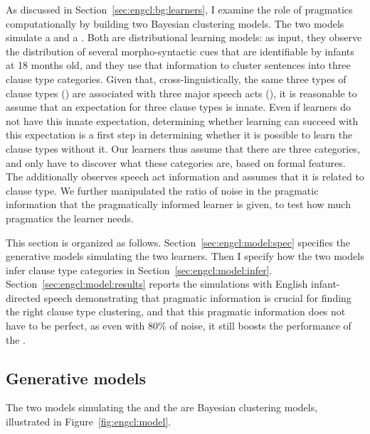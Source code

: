 As discussed in Section~\ref{sec:engcl:bg:learners}, I examine the role of pragmatics computationally by building two Bayesian clustering models. The two models simulate a \distlearner{} and a \praglearner{}. Both are distributional learning models: as input, they observe the distribution of several morpho-syntactic cues that are identifiable by infants at 18 months old, and they use that information to cluster sentences into three clause type categories. Given that, cross-linguistically, the same three types of clause types (\diis{}) are associated with three major speech acts (\aqrs{}), it is reasonable to assume that an expectation for three clause types is innate. Even if learners do not have this innate expectation, determining whether learning can succeed with this expectation is a first step in determining whether it is possible to learn the clause types without it. Our learners thus assume that there are three categories, and only have to discover what these categories are, based on formal features. The \praglearner{} additionally observes speech act information and assumes that it is related to clause type. We further manipulated the ratio of noise in the pragmatic information that the pragmatically informed learner is given, to test how much pragmatics the learner needs.


This section is organized as follows. Section~\ref{sec:engcl:model:spec} specifies the generative models simulating the two learners. Then I specify how the two models infer clause type categories in Section~\ref{sec:engcl:model:infer}. Section~\ref{sec:engcl:model:results} reports the simulations with English infant-directed speech demonstrating that pragmatic information is crucial for finding the right clause type clustering, and that this pragmatic information does not have to be perfect, as even with 80\% of noise, it still boosts the performance of the \praglearner{}. 

\subsection{Generative models}
The two models simulating the \distlearner{} and the \praglearner{} are Bayesian clustering models, illustrated in Figure~\ref{fig:engcl:model}.%

\label{sec:engcl:model:spec}

